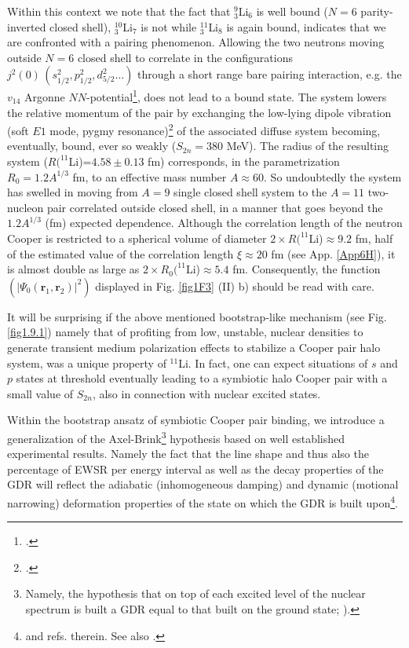  Within this context we note that the fact that $^9_3$Li$_6$ is well bound ($N=6$  parity-inverted closed shell), $^{10}_3$Li$_7$ is not while $^{11}_3$Li$_8$ is again bound, indicates that we are confronted with a pairing phenomenon. Allowing the two neutrons moving outside $N=6$ closed shell to correlate in the configurations $j^2(0)\, (s_{1/2}^2, p_{1/2}^2, d_{5/2}^2\dots)$ through a short range bare pairing interaction, e.g. the $v_{14}$ Argonne $NN$-potential\footnote{\cite{Wiringa:84}.}, does not lead to a bound state. The system lowers the relative momentum of the pair by exchanging  the low-lying dipole vibration (soft $E1$ mode, pygmy resonance)\footnote{\cite{Broglia:19}.} of the associated diffuse system becoming, eventually, bound, ever so weakly ($S_{2n}=380$ MeV). The radius of the resulting system ($R(^{11}$Li)=$4.58\pm 0.13$ fm) corresponds, in the parametrization $R_0=1.2 A^{1/3}$ fm, to an effective mass number $A\approx 60$. So undoubtedly the system has swelled in moving from $A=9$ single closed shell system to the $A=11$ two-nucleon pair correlated outside closed shell, in a manner that goes beyond the $1.2A^{1/3}$ (fm) expected dependence. Although the correlation length of the neutron Cooper is restricted to a spherical volume of diameter $2\times R(^{11}$Li)$\approx 9.2$ fm, half of the estimated value of the correlation length 
  $\xi\approx 20$ 
   fm (see App. \ref{App6H}), it is almost double as large as $2\times R_0(^{11}$Li)$\approx 5.4$ fm. Consequently, the function $(|\Psi_0(\mathbf r_1,\mathbf r_2)|^2)$ displayed  in Fig. \ref{fig1F3} (II) b) should be read with care.

It will be surprising if the above mentioned  bootstrap-like mechanism 
 (see Fig. \ref{fig1.9.1})  namely that of profiting from  low, unstable, nuclear densities to generate transient medium polarization effects to stabilize a Cooper pair halo system, was a unique property of $^{11}$Li. In fact, one can expect  situations of $s$ and $p$ states at threshold eventually leading to a symbiotic halo Cooper pair with a small value of $S_{2n}$, also in connection with  nuclear excited states. 





 
Within the bootstrap ansatz of symbiotic Cooper pair binding, we introduce a  generalization of the Axel-Brink\footnote{Namely, the hypothesis that on top of each excited level of the nuclear spectrum is built a GDR equal to that built on the ground state; \cite{Axel:62,Brink:55}).} hypothesis based on  well established experimental    results. Namely the fact that the line shape and thus also the percentage of EWSR per energy interval as well as the decay properties of the GDR will reflect the  adiabatic (inhomogeneous damping) and dynamic (motional narrowing) deformation properties of the state on which the GDR is built upon\footnote{\cite{LeTourneaux:65,Bohr:75,Bortignon:98} and refs. therein. See also \cite{Dattagupta:87}.}.

